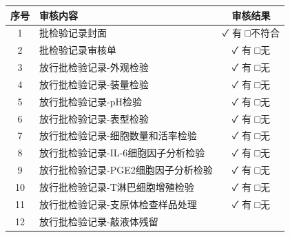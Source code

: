 \documentclass[UTF8,10pt,a4paper,fontset=fandol]{ctexart}
\newcommand{\fieldvalue}[1]{#1}
\newcommand{\handwritten}[1]{#1}
\begin{document}
\begin{center}
\small
\begin{tabularx}{\textwidth}{|c|X|c|}
\hline
序号 & 审核内容 & 审核结果 \\
\hline
1 & 批检验记录封面 &
\fieldvalue{\handwritten{✓ 有}} \quad □不符合 \\
\hline
2 & 批检验记录审核单 &
\fieldvalue{\handwritten{✓ 有}} \quad □无 \\
\hline
3 & 放行批检验记录-外观检验 &
\fieldvalue{\handwritten{✓ 有}} \quad □无 \\
\hline
4 & 放行批检验记录-装量检验 &
\fieldvalue{\handwritten{✓ 有}} \quad □无 \\
\hline
5 & 放行批检验记录-pH检验 &
\fieldvalue{\handwritten{✓ 有}} \quad □无 \\
\hline
6 & 放行批检验记录-表型检验 &
\fieldvalue{\handwritten{✓ 有}} \quad □无 \\
\hline
7 & 放行批检验记录-细胞数量和活率检验 &
\fieldvalue{\handwritten{✓ 有}} \quad □无 \\
\hline
8 & 放行批检验记录-IL-6细胞因子分析检验 &
\fieldvalue{\handwritten{✓ 有}} \quad □无 \\
\hline
9 & 放行批检验记录-PGE2细胞因子分析检验 &
\fieldvalue{\handwritten{✓ 有}} \quad □无 \\
\hline
10 & 放行批检验记录-T淋巴细胞增殖检验 &
\fieldvalue{\handwritten{✓ 有}} \quad □无 \\
\hline
11 & 放行批检验记录-支原体检查样品处理 &
\fieldvalue{\handwritten{✓ 有}} \quad □无 \\
\hline
12 & 放行批检验记录-敲液体残留 &

\end{tabularx}
\end{center}
\end{document}
